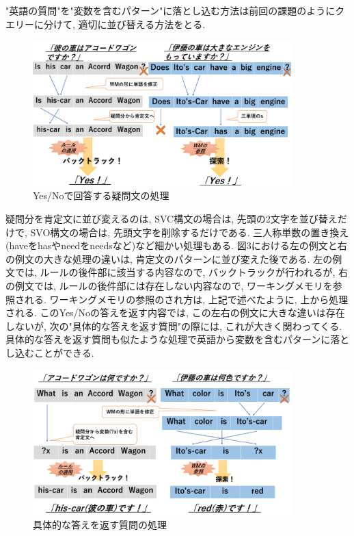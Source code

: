 \documentclass[uplatex,12pt]{jsarticle}
\begin{document}
"英語の質問"を"変数を含むパターン"に落とし込む方法は前回の課題のようにクエリーに分けて, 適切に並び替える方法をとる.

\begin{figure}[htbp]
 \begin{center}
  \includegraphics[width = 10cm, pagebox = cropbox, clip]{images/英文構造_YesNo型.pdf}
 \end{center}
 \caption[]{Yes/Noで回答する疑問文の処理}\label{fig:fig1.1}
\end{figure}

疑問分を肯定文に並び変えるのは, SVC構文の場合は, 先頭の2文字を並び替えだけで, SVO構文の場合は, 先頭文字を削除するだけである. 三人称単数の置き換え(haveをhasやneedをneedsなど)など細かい処理もある. 図3における左の例文と右の例文の大きな処理の違いは, 肯定文のパターンに並び変えた後である. 左の例文では, ルールの後件部に該当する内容なので, バックトラックが行われるが, 右の例文では, ルールの後件部には存在しない内容なので, ワーキングメモリを参照される. ワーキングメモリの参照のされ方は, 上記で述べたように, 上から処理される. このYes/Noの答えを返す内容では, この左右の例文に大きな違いは存在しないが, 次の"具体的な答えを返す質問"の際には, これが大きく関わってくる.\\


具体的な答えを返す質問も似たような処理で英語から変数を含むパターンに落とし込むことができる. 
\begin{figure}[htbp]
 \begin{center}
  \includegraphics[width = 10cm, pagebox = cropbox, clip]{images/英文構造_疑問詞SVO.pdf}
 \end{center}
 \caption[]{具体的な答えを返す質問の処理}\label{fig:fig1.1}
\end{figure}
\end{document}
